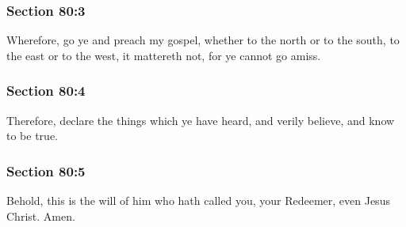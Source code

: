 	\subsubsection{Section 80:3} %
		\label{DC80-3}

		Wherefore, go ye and preach my gospel, whether to the north or to the south, to the east or to the west, it mattereth not, for ye cannot go amiss.


	\subsubsection{Section 80:4} %
		\label{DC80-4}

		Therefore, declare the things which ye have heard, and verily believe, and know to be true.


	\subsubsection{Section 80:5} %
		\label{DC80-5}

		Behold, this is the will of him who hath called you, your Redeemer, even Jesus Christ.  Amen.


